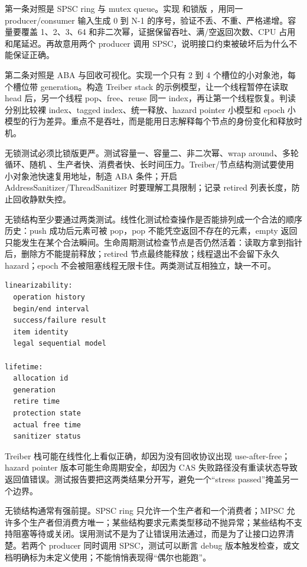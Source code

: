 第一条对照是 SPSC ring 与 mutex queue。实现  和锁版 ，用同一 producer/consumer 输入生成 0 到 N-1 的序号，验证不丢、不重、严格递增。容量要覆盖 1、2、3、64 和非二次幂，证据保留吞吐、满/空返回次数、CPU 占用和尾延迟。再故意用两个 producer 调用 SPSC，说明接口约束被破坏后为什么不能保证正确。

第二条对照是 ABA 与回收可视化。实现一个只有 2 到 4 个槽位的小对象池，每个槽位带 generation。构造 Treiber stack 的示例模型，让一个线程暂停在读取 head 后，另一个线程 pop、free、reuse 同一 index，再让第一个线程恢复。判读分别比较裸 index、tagged index、统一释放、hazard pointer 小模型和 epoch 小模型的行为差异。重点不是吞吐，而是能用日志解释每个节点的身份变化和释放时机。

无锁测试必须比锁版更严。测试容量一、容量二、非二次幂、wrap around、多轮循环、随机 、生产者快、消费者快、长时间压力。Treiber/节点结构测试要使用小对象池快速复用地址，制造 ABA 条件；开启 AddressSanitizer/ThreadSanitizer 时要理解工具限制；记录 retired 列表长度，防止回收静默失控。

无锁结构至少要通过两类测试。线性化测试检查操作是否能排列成一个合法的顺序历史：push 成功后元素可被 pop，pop 不能凭空返回不存在的元素，empty 返回只能发生在某个合法瞬间。生命周期测试检查节点是否仍然活着：读取方拿到指针后，删除方不能提前释放；retired 节点最终能释放；线程退出不会留下永久 hazard；epoch 不会被阻塞线程无限卡住。两类测试互相独立，缺一不可。

\begin{lstlisting}[numbers=none,caption={无锁结构测试分层}]
linearizability:
  operation history
  begin/end interval
  success/failure result
  item identity
  legal sequential model

lifetime:
  allocation id
  generation
  retire time
  protection state
  actual free time
  sanitizer status
\end{lstlisting}

Treiber 栈可能在线性化上看似正确，却因为没有回收协议出现 use-after-free；hazard pointer 版本可能生命周期安全，却因为 CAS 失败路径没有重读状态导致返回值错误。测试报告要把这两类结果分开写，避免一个“stress passed”掩盖另一个边界。

无锁结构通常有强前提。SPSC ring 只允许一个生产者和一个消费者；MPSC 允许多个生产者但消费方唯一；某些结构要求元素类型移动不抛异常；某些结构不支持阻塞等待或关闭。误用测试不是为了让错误用法通过，而是为了让接口边界清楚。若两个 producer 同时调用 SPSC，测试可以断言 debug 版本触发检查，或文档明确标为未定义使用；不能悄悄表现得“偶尔也能跑”。

